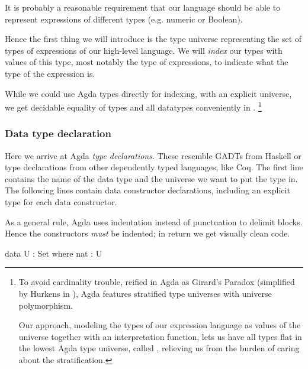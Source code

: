 It is probably a reasonable requirement that our language should be able to represent
expressions of different types (e.g. numeric or Boolean).

Hence the first thing we will introduce is the type universe representing the set of
types of expressions of our high-level language. We will \emph{index} our types with
values of this type, most notably the type  of expressions, to
indicate what the type of the expression is.

While we could use Agda
types directly for indexing, with an explicit universe, we get decidable
equality of types and all datatypes conveniently in .%
\footnote{To avoid cardinality trouble, reified in Agda as Girard's Paradox
\cite{girard:dissertation} (simplified by Hurkens in \cite{hurkens}),
Agda features stratified type universes with universe polymorphism.

Our approach, modeling the types of our expression language as values
of the universe  together with an interpretation function,
lets us have all types flat in the lowest Agda type
universe, called , relieving us from the burden of caring about the
stratification.}


\subsubsection{Data type declaration}

Here we arrive at Agda \emph{type declarations}. These resemble GADTs from
Haskell or type declarations from other dependently typed languages, like Coq.
The first line contains the name of the data type and the universe we want to
put the type in. The following lines contain data constructor declarations,
including an explicit type for each data constructor.

As a general rule, Agda uses indentation instead of punctuation to delimit
blocks. Hence the constructors \emph{must} be indented; in return we get
visually clean code.

\begin{code}
  data U : Set where
    nat : U
\end{code}


